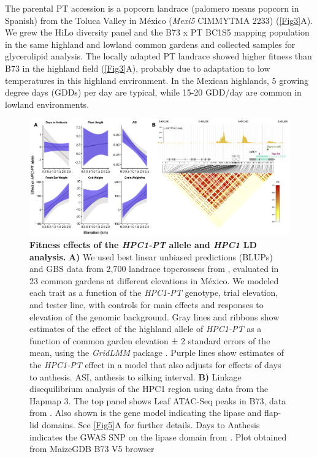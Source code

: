 \documentclass[9pt,twocolumn,twoside,lineno]{biorxiv}
\newcommand{\hpc}{\textit{HPC1}\xspace}
\begin{document}
The parental PT accession is a popcorn landrace (palomero means popcorn in Spanish) from the Toluca Valley in M\'exico (\textit{Mexi5} CIMMYTMA 2233) (\cref{Fig3}A). 
We grew the HiLo diversity panel and the B73 x PT BC1S5 mapping population in the same highland and lowland common gardens and collected samples for glycerolipid analysis.
The locally adapted PT landrace showed higher fitness than B73 in the highland field (\cref{Fig3}A), probably due to adaptation to low temperatures in this highland environment.  
In the Mexican highlands, 5 growing degree days (GDDs) per day are typical, while 15-20 GDD/day are common in lowland environments. 

\begin{figure}[htp]
\centering
\includegraphics[width=0.8\paperwidth]{Figures/Fig_4.png}
\caption{\textbf{Fitness effects of the \textit{HPC1-PT} allele and \hpc LD analysis.} \textbf{A)}
We used best linear unbiased predictions (BLUPs) and GBS data from 2,700 landrace topcrossess from \cite{Gates2019-xu}, evaluated in 23 common gardens at different elevations in M\'exico. 
We modeled each trait as a function of the \textit{HPC1-PT} genotype, trial elevation, and tester line, with controls for main effects and responses to elevation of the genomic background. 
Gray lines and ribbons show estimates of the effect of the highland allele of \textit{HPC1-PT} as a function of common garden elevation ± 2 standard errors of the mean, using the \textit{GridLMM} package \cite{Runcie2019-Gr}. 
Purple lines show estimates of the \textit{HPC1-PT} effect in a model that also adjusts for effects of days to anthesis. ASI, anthesis to silking interval. 
\textbf{B)} Linkage disequilibrium analysis of the HPC1 region using data from the Hapmap 3. 
The top panel shows Leaf ATAC-Seq peaks in B73, data from  \cite{Ricci2019-zj}.
Also shown is the  gene model indicating the lipase and flap-lid domains. 
See \ref{Fig5}A for further details.
Days to Anthesis indicates the GWAS SNP on the lipase domain from \cite{Wallace2014-yy}. 
Plot obtained from MaizeGDB B73 V5 browser \cite{Woodhouse2021-wd}}
\label{Fig4}
\end{figure}
\end{document}
